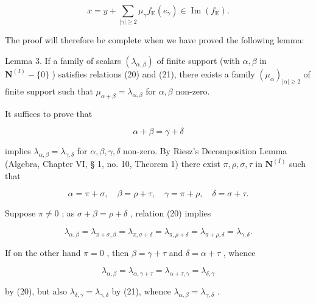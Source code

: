 \[
x = y + \sum_ {| \gamma | \geqslant 2} \mu_ {\gamma} f _ {\mathrm{E}} (e _ {\gamma}) \in \operatorname{Im} (f _ {\mathrm{E}}).
\]

The proof will therefore be complete when we have proved the following lemma:

Lemma 3. If a family of scalars \((\lambda_{\alpha, \beta})\) of finite support (with \(\alpha, \beta\) in \(\mathbf{N}^{(I)} - \{0\}\) ) satisfies relations (20) and (21), there exists a family \((\mu_{\alpha})_{|\alpha| \geqslant 2}\) of finite support such that \(\mu_{\alpha + \beta} = \lambda_{\alpha, \beta}\) for \(\alpha, \beta\) non-zero.

It suffices to prove that

\[
\alpha + \beta = \gamma + \delta\tag{23}
\]

implies \(\lambda_{\alpha, \beta} = \lambda_{\gamma, \delta}\) for \(\alpha, \beta, \gamma, \delta\) non-zero. By Riesz's Decomposition Lemma (Algebra, Chapter VI, § 1, no. 10, Theorem 1) there exist \(\pi, \rho, \sigma, \tau\) in \(\mathbf{N}^{(I)}\) such that

\[
\alpha = \pi + \sigma , \quad \beta = \rho + \tau , \quad \gamma = \pi + \rho , \quad \delta = \sigma + \tau .
\]

Suppose \(\pi \neq 0\) ; as \(\sigma + \beta = \rho + \delta\) , relation (20) implies

\[
\lambda_ {\alpha , \beta} = \lambda_ {\pi + \sigma , \beta} = \lambda_ {\pi , \sigma + \delta} = \lambda_ {\pi , \rho + \delta} = \lambda_ {\pi + \rho , \delta} = \lambda_ {\gamma , \delta}.
\]

If on the other hand \(\pi = 0\) , then \(\beta = \gamma + \tau\) and \(\delta = \alpha + \tau\) , whence

\[
\lambda_ {\alpha , \beta} = \lambda_ {\alpha , \gamma + \tau} = \lambda_ {\alpha + \tau , \gamma} = \lambda_ {\delta , \gamma}
\]

by (20), but also \(\lambda_{\delta, \gamma} = \lambda_{\gamma, \delta}\) by (21), whence \(\lambda_{\alpha, \beta} = \lambda_{\gamma, \delta}\) .

